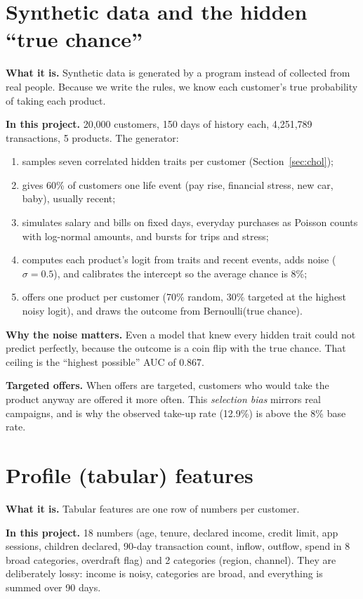 \documentclass[10pt,a4paper]{article}
\newcommand{\what}[1]{\par\textbf{What it is.} #1}
\newcommand{\here}[1]{\par\textbf{In this project.} #1}
\begin{document}
\section{Synthetic data and the hidden ``true chance''}
\what{Synthetic data is generated by a program instead of collected from real people. Because we write the rules, we know each customer's true probability of taking each product.}
\here{20,000 customers, 150 days of history each, 4,251,789 transactions, 5 products. The generator:
\begin{enumerate}
\item samples seven correlated hidden traits per customer (Section~\ref{sec:chol});
\item gives 60\% of customers one life event (pay rise, financial stress, new car, baby), usually recent;
\item simulates salary and bills on fixed days, everyday purchases as Poisson counts with log-normal amounts, and bursts for trips and stress;
\item computes each product's logit from traits and recent events, adds noise ($\sigma=0.5$), and calibrates the intercept so the average chance is 8\%;
\item offers one product per customer (70\% random, 30\% targeted at the highest noisy logit), and draws the outcome from Bernoulli(true chance).
\end{enumerate}}
\textbf{Why the noise matters.} Even a model that knew every hidden trait could not predict perfectly, because the outcome is a coin flip with the true chance. That ceiling is the ``highest possible'' AUC of 0.867.

\textbf{Targeted offers.} When offers are targeted, customers who would take the product anyway are offered it more often. This \emph{selection bias} mirrors real campaigns, and is why the observed take-up rate (12.9\%) is above the 8\% base rate.

\section{Profile (tabular) features}
\what{Tabular features are one row of numbers per customer.}
\here{18 numbers (age, tenure, declared income, credit limit, app sessions, children declared, 90-day transaction count, inflow, outflow, spend in 8 broad categories, overdraft flag) and 2 categories (region, channel). They are deliberately lossy: income is noisy, categories are broad, and everything is summed over 90 days.}
\end{document}

